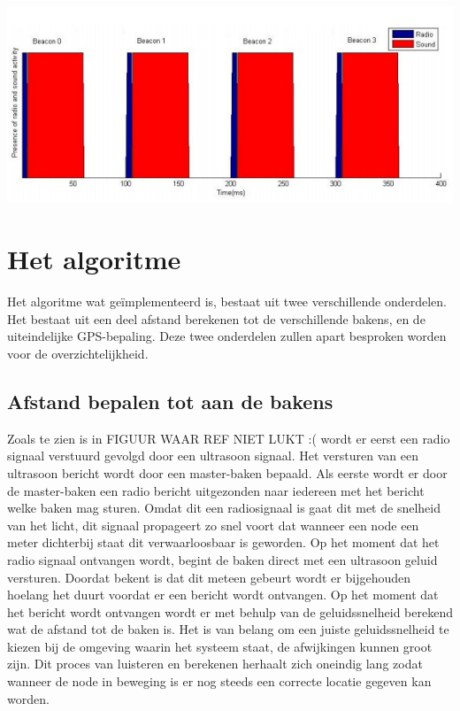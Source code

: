 \documentclass{article}
\begin{document}
\includegraphics{berichten_bakens}



\section{Het algoritme}
Het algoritme wat ge\"{i}mplementeerd is, bestaat uit twee verschillende onderdelen. Het bestaat uit een deel afstand berekenen tot de verschillende bakens, en de uiteindelijke GPS-bepaling. 
Deze twee onderdelen zullen apart besproken worden voor de overzichtelijkheid.
	
\subsection{Afstand bepalen tot aan de bakens}
	Zoals te zien is in FIGUUR WAAR REF NIET LUKT :( wordt er eerst een radio signaal verstuurd gevolgd door een ultrasoon signaal. Het versturen van een ultrasoon bericht wordt door een master-baken bepaald. Als eerste wordt er door de master-baken een radio bericht uitgezonden naar iedereen met het bericht welke baken mag sturen. Omdat dit een radiosignaal is gaat dit met de snelheid van het licht, dit signaal propageert zo snel voort dat wanneer een node een meter dichterbij staat dit verwaarloosbaar is geworden. Op het moment dat het radio signaal ontvangen wordt, begint de baken direct met een ultrasoon geluid versturen. Doordat bekent is dat dit meteen gebeurt wordt er bijgehouden hoelang het duurt voordat er een bericht wordt ontvangen. Op het moment dat het bericht wordt ontvangen wordt er met behulp van de geluidssnelheid berekend wat de afstand tot de baken is. Het is van belang om een juiste geluidssnelheid te kiezen bij de omgeving waarin het systeem staat, de afwijkingen kunnen groot zijn. Dit proces van luisteren en berekenen herhaalt zich oneindig lang zodat wanneer de node in beweging is er nog steeds een correcte locatie gegeven kan worden. 
	
\end{document}
